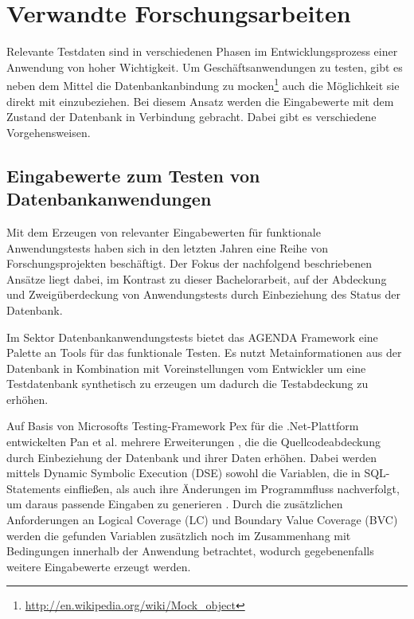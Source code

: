 \section{Verwandte Forschungsarbeiten}\label{chap:relatedwork}

%
%

Relevante Testdaten sind in verschiedenen Phasen im Entwicklungsprozess einer Anwendung von hoher Wichtigkeit.
Um Geschäftsanwendungen zu testen, gibt es neben dem Mittel die Datenbankanbindung zu mocken\footnote{\url{http://en.wikipedia.org/wiki/Mock_object}} auch die Möglichkeit sie direkt mit einzubeziehen.
Bei diesem Ansatz werden die Eingabewerte mit dem Zustand der Datenbank in Verbindung gebracht.
Dabei gibt es verschiedene Vorgehensweisen.

\subsection{Eingabewerte zum Testen von Datenbankanwendungen}
Mit dem Erzeugen von relevanter Eingabewerten für funktionale Anwendungstests haben sich in den letzten Jahren eine Reihe von Forschungsprojekten beschäftigt.
Der Fokus der nachfolgend beschriebenen Ansätze liegt dabei, im Kontrast zu dieser Bachelorarbeit, auf der Abdeckung und Zweigüberdeckung von Anwendungstests durch Einbeziehung des Status der Datenbank.

Im Sektor Datenbankanwendungstests bietet das AGENDA Framework \cite{Chays:2000:FTD:347324.348954, Chays:2004:TDG:997669, Chays:2004:ATR:1077269.1077271, Deng:2005:TDT:1062455.1062486, Chays:2008:QTG:1385269.1385277} eine Palette an Tools für das funktionale Testen.
Es nutzt Metainformationen aus der Datenbank in Kombination mit Voreinstellungen vom Entwickler um eine Testdatenbank synthetisch zu erzeugen um dadurch die Testabdeckung zu erhöhen.

Auf Basis von Microsofts Testing-Framework Pex für die .Net-Plattform \cite{Tillmann:2008:PWB:1792786.1792798} entwickelten Pan et al. mehrere Erweiterungen \cite{Pan:2011:GPI:2190078.2190154, Pan:2011:DSG:1988842.1988846}, die die Quellcodeabdeckung durch Einbeziehung der Datenbank und ihrer Daten erhöhen.
Dabei werden mittels Dynamic Symbolic Execution (DSE) \cite{Cadar:2006:EAG:1180405.1180445, Godefroid:2005:DDA:1065010.1065036} sowohl die Variablen, die in SQL-Statements einfließen, als auch ihre Änderungen im Programmfluss nachverfolgt, um daraus passende Eingaben zu generieren \cite{Pan:2011:GPI:2190078.2190154}.
Durch die zusätzlichen Anforderungen an Logical Coverage (LC) \cite{DBLP:conf/issre/AmmannOH03} und Boundary Value Coverage (BVC) \cite{DBLP:conf/issre/KosmatovLPU04} werden die gefunden Variablen zusätzlich noch im Zusammenhang mit Bedingungen innerhalb der Anwendung betrachtet, wodurch gegebenenfalls weitere Eingabewerte erzeugt werden. 

